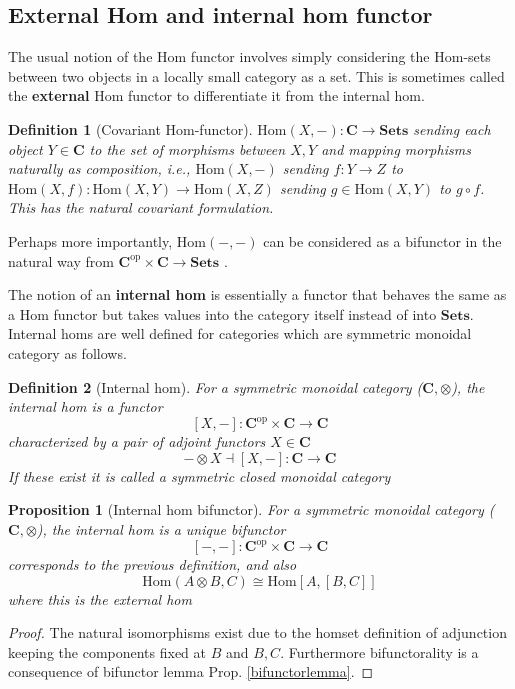 \documentclass[12pt]{article}
\numberwithin{equation}{section}
\newcommand{\Hom}{{\mathrm{Hom}}}
\newtheorem{definition}{Definition}[section]
\newtheorem{proposition}{Proposition}[section]
\begin{document}
	\subsection{External Hom and internal hom functor}
	The usual notion of the Hom functor involves simply considering the Hom-sets between two objects in a locally small category as a set. This is sometimes called the \textbf{external} Hom functor to differentiate it from the internal hom.
	\begin{definition}[Covariant Hom-functor]
		$\Hom(X,-): \mathbf{C} \to \mathbf{Sets}$ sending each object $Y \in \mathbf{C}$ to the set of morphisms between $X,Y$ and mapping morphisms naturally as composition, i.e., $\Hom(X,-)$ sending $f:Y \to Z$ to $\Hom(X,f): \Hom(X,Y)\to \Hom(X,Z)$
		sending $g\in \Hom(X,Y)$ to $g \circ f$. This has the natural covariant formulation.
	\end{definition}
	
	Perhaps more importantly, $\Hom(-,-)$ can be considered as a bifunctor in the natural way from $\mathbf{C}^{\mathrm{op}}\times \mathbf{C} \to \mathbf{Sets}$ \cite{nlab:hom-functor}.
	
	The notion of an \textbf{internal hom} is essentially a functor that behaves the same as a Hom functor but takes values into the category itself instead of into $\mathbf{Sets}$.
	Internal homs are well defined for categories which are symmetric monoidal category as follows.
	
	\begin{definition}[Internal hom]
		For a symmetric monoidal category ($\mathbf{C}, \otimes$), the internal hom is a functor \[ [X,-]: \mathbf{C}^{\mathrm{op}} \times \mathbf{C} \to \mathbf{C}\]
		characterized by a pair of adjoint functors $X \in \mathbf{C}$ \[ -\otimes X \dashv [X,-]: \mathbf{C}  \to \mathbf{C}\] If these exist it is called a symmetric closed monoidal category
	\end{definition}
	
	\begin{proposition}[Internal hom bifunctor]
		For a symmetric monoidal category ($\mathbf{C}, \otimes$), the internal hom is a unique bifunctor \[ [-,-]: \mathbf{C}^{\mathrm{op}} \times \mathbf{C} \to \mathbf{C}\]
		corresponds to the previous definition, and also \[  \Hom (A \otimes B, C) \cong \Hom[A, [B,C]]\] where this is the external hom
	\end{proposition}
	\begin{proof}
		The natural isomorphisms exist due to the homset definition of adjunction keeping the components fixed at $B$ and $B, C $. Furthermore bifunctorality is a consequence of bifunctor lemma Prop. \ref{bifunctorlemma}.
	\end{proof}
	
\end{document}
